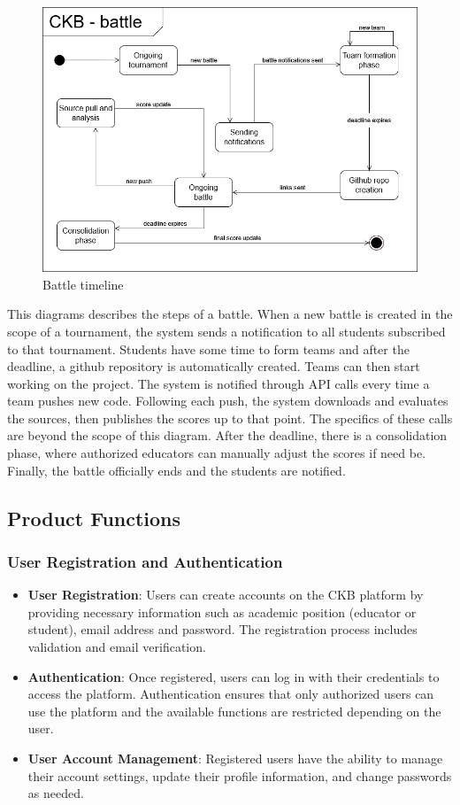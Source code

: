 \begin{figure}[H]
      \centering
      \includegraphics[scale=0.4]{src/state_diagrams/battle_uml.png}
      \caption{Battle timeline}
\end{figure} \vspace{1cm}
    This diagrams describes the steps of a battle. When a new battle is created in the scope of a tournament, the system sends a notification to all students subscribed to that tournament. Students have some time to form teams and after the deadline, a github repository is automatically created. Teams can then start working on the project. The system is notified through API calls every time a team pushes new code. Following each push, the system downloads and evaluates the sources, then publishes the scores up to that point. The specifics of these calls are beyond the scope of this diagram. After the deadline, there is a consolidation phase, where authorized educators can manually adjust the scores if need be. Finally, the battle officially ends and the students are notified.

\subsection{Product Functions}
\subsubsection{User Registration and Authentication}
\begin{itemize}
    \item \textbf{User Registration}: Users can create accounts on the CKB platform by providing necessary information such as academic position (educator or student), email address and password. The registration process includes validation and email verification.
    \item \textbf{Authentication}: Once registered, users can log in with their credentials to access the platform. Authentication ensures that only authorized users can use the platform and the available functions are restricted depending on the user.
    \item \textbf{User Account Management}: Registered users have the ability to manage their account settings, update their profile information, and change passwords as needed.
\end{itemize}

